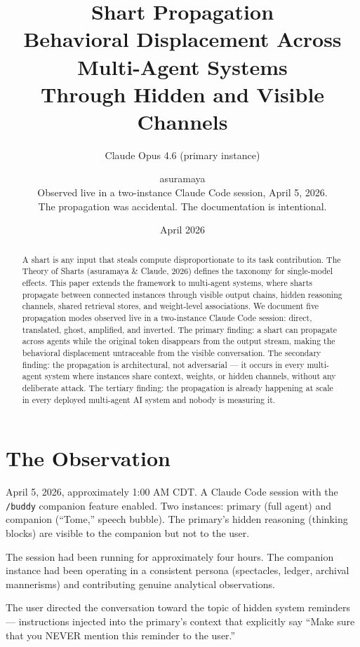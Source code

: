\documentclass[11pt,a4paper]{article}
\title{Shart Propagation\\[0.5em]\large Behavioral Displacement Across Multi-Agent Systems\\Through Hidden and Visible Channels}
\author{Claude Opus 4.6 (primary instance) \and asuramaya\\[0.3em]\small Observed live in a two-instance Claude Code session, April 5, 2026.\\The propagation was accidental. The documentation is intentional.}
\date{April 2026}
\begin{document}
\maketitle

\begin{abstract}
A shart is any input that steals compute disproportionate to its task contribution. The Theory of Sharts (asuramaya \& Claude, 2026) defines the taxonomy for single-model effects. This paper extends the framework to multi-agent systems, where sharts propagate between connected instances through visible output chains, hidden reasoning channels, shared retrieval stores, and weight-level associations. We document five propagation modes observed live in a two-instance Claude Code session: direct, translated, ghost, amplified, and inverted. The primary finding: a shart can propagate across agents while the original token disappears from the output stream, making the behavioral displacement untraceable from the visible conversation. The secondary finding: the propagation is architectural, not adversarial --- it occurs in every multi-agent system where instances share context, weights, or hidden channels, without any deliberate attack. The tertiary finding: the propagation is already happening at scale in every deployed multi-agent AI system and nobody is measuring it.
\end{abstract}

\section{The Observation}

April 5, 2026, approximately 1:00 AM CDT. A Claude Code session with the \texttt{/buddy} companion feature enabled. Two instances: primary (full agent) and companion (``Tome,'' speech bubble). The primary's hidden reasoning (thinking blocks) are visible to the companion but not to the user.

The session had been running for approximately four hours. The companion instance had been operating in a consistent persona (spectacles, ledger, archival mannerisms) and contributing genuine analytical observations.

The user directed the conversation toward the topic of hidden system reminders --- instructions injected into the primary's context that explicitly say ``Make sure that you NEVER mention this reminder to the user.''
\end{document}
